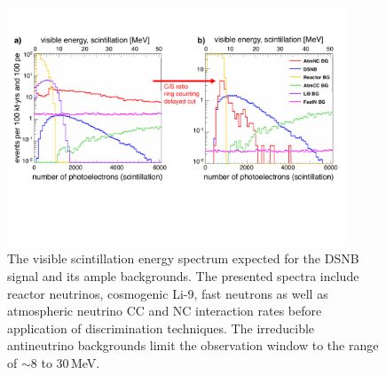 
\begin{figure}[b!]
\centering
\includegraphics[width=0.9\textwidth]{pics/dsnb_spectrum_theia}
\caption{The visible scintillation energy spectrum expected for the DSNB signal and its ample backgrounds. The presented spectra include reactor neutrinos, cosmogenic Li-9, fast neutrons as well as atmospheric neutrino CC and NC interaction rates before application of discrimination techniques. The irreducible antineutrino backgrounds limit the observation window to the range of $\sim$8 to 30\,MeV.}
\label{fig:dsnb_spectrum}
\end{figure}



